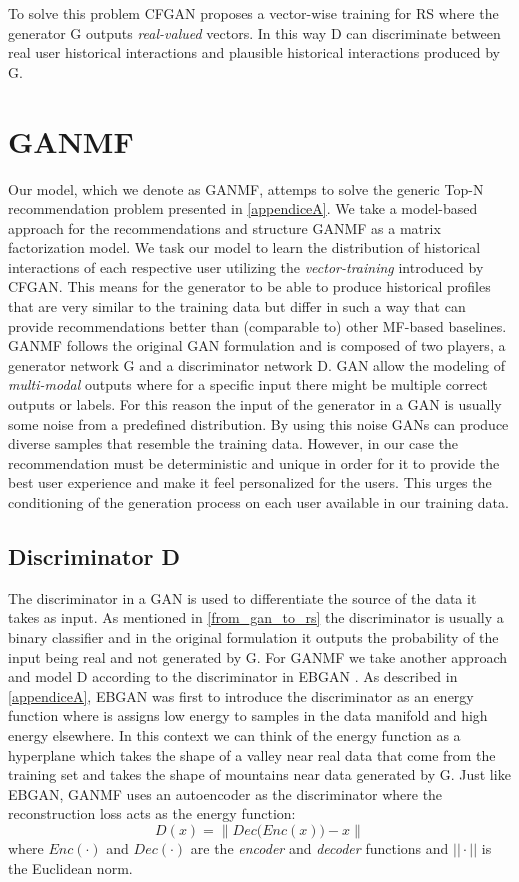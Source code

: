 To solve this problem CFGAN proposes a vector-wise training for RS where the generator G outputs \emph{real-valued} vectors. In this way D can discriminate between real user historical interactions and plausible historical interactions produced by G.

\section{GANMF}
\label{sec:GANMF}
Our model, which we denote as GANMF, attemps to solve the generic Top-N recommendation problem presented in \ref{appendiceA}. We take a model-based approach for the recommendations and structure GANMF as a matrix factorization model. We task our model to learn the distribution of historical interactions of each respective user utilizing the \emph{vector-training} introduced by CFGAN. This means for the generator to be able to produce historical profiles that are very similar to the training data but differ in such a way that can provide recommendations better than (comparable to) other MF-based baselines. GANMF follows the original GAN formulation and is composed of two players, a generator network G and a discriminator network D. GAN allow the modeling of \emph{multi-modal} outputs \cite{goodfellow2016nips} where for a specific input there might be multiple correct outputs or labels. For this reason the input of the generator in a GAN is usually some noise from a predefined distribution. By using this noise GANs can produce diverse samples that resemble the training data. However, in our case the recommendation must be deterministic and unique in order for it to provide the best user experience and make it feel personalized for the users. This urges the conditioning of the generation process on each user available in our training data.

\subsection{Discriminator D}
\label{sec:GANMF_D}
The discriminator in a GAN is used to differentiate the source of the data it takes as input. As mentioned in \ref{from_gan_to_rs} the discriminator is usually a binary classifier and in the original formulation it outputs the probability of the input being real and not generated by G. For GANMF we take another approach and model D according to the discriminator in EBGAN \cite{zhao2016energy}. As described in \ref{appendiceA}, EBGAN was first to introduce the discriminator as an energy function where is assigns low energy to samples in the data manifold and high energy elsewhere. In this context we can think of the energy function as a hyperplane which takes the shape of a valley near real data that come from the training set and takes the shape of mountains near data generated by G. Just like EBGAN, GANMF uses an autoencoder \cite{kramer1991nonlinear} as the discriminator where the reconstruction loss acts as the energy function:
\begin{equation}
    D(x) = \big\|Dec\big(Enc(x)\big) - x\big\|
    \label{eq:recon_loss}
\end{equation}
where $Enc(\cdot)$ and $Dec(\cdot)$ are the \emph{encoder} and \emph{decoder} functions and $||\cdot||$ is the Euclidean norm.

